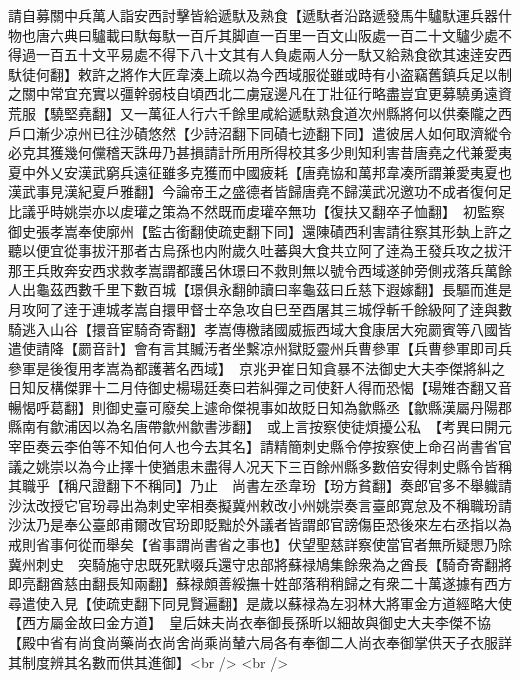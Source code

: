 請自募關中兵萬人詣安西討擊皆給遞馱及熟食【遞馱者沿路遞發馬牛驢馱運兵器什物也唐六典曰驢載曰馱每馱一百斤其脚直一百里一百文山阪處一百二十文驢少處不得過一百五十文平易處不得下八十文其有人負處兩人分一馱又給熟食欲其速逹安西馱徒何翻】敕許之將作大匠韋湊上疏以為今西域服從雖或時有小盗竊舊鎮兵足以制之關中常宜充實以彊幹弱枝自頃西北二虜寇邊凡在丁壯征行略盡豈宜更募驍勇遠資荒服【驍堅堯翻】又一萬征人行六千餘里咸給遞馱熟食道次州縣將何以供秦隴之西戶口漸少凉州已往沙磧悠然【少詩沼翻下同磧七迹翻下同】遣彼居人如何取濟縱令必克其獲幾何儻稽天誅毋乃甚損請計所用所得校其多少則知利害昔唐堯之代兼愛夷夏中外乂安漢武窮兵遠征雖多克獲而中國疲耗【唐堯協和萬邦韋凑所謂兼愛夷夏也漢武事見漢紀夏戶雅翻】今論帝王之盛德者皆歸唐堯不歸漢武况邀功不成者復何足比議乎時姚崇亦以䖍瓘之策為不然既而䖍瓘卒無功【復扶又翻卒子恤翻】　初監察御史張孝嵩奉使廓州【監古銜翻使疏吏翻下同】還陳磧西利害請往察其形埶上許之聽以便宜從事拔汗那者古烏孫也内附歲久吐蕃與大食共立阿了逹為王發兵攻之拔汗那王兵敗奔安西求救孝嵩謂都護呂休璟曰不救則無以號令西域遂帥旁側戎落兵萬餘人出龜茲西數千里下數百城【璟俱永翻帥讀曰率龜茲曰丘慈下遐嫁翻】長驅而進是月攻阿了逹于連城孝嵩自擐甲督士卒急攻自巳至酉屠其三城俘斬千餘級阿了逹與數騎逃入山谷【擐音宦騎奇寄翻】孝嵩傳檄諸國威振西域大食康居大宛罽賓等八國皆遣使請降【罽音計】會有言其贓汚者坐繫凉州獄貶靈州兵曹參軍【兵曹參軍即司兵參軍是後復用孝嵩為都護著名西域】　京兆尹崔日知貪暴不法御史大夫李傑將糾之日知反構傑罪十二月侍御史楊瑒廷奏曰若糾彈之司使姧人得而恐愒【瑒雉杏翻又音暢愒呼葛翻】則御史臺可廢矣上遽命傑視事如故貶日知為歙縣丞【歙縣漢屬丹陽郡縣南有歙浦因以為名唐帶歙州歙書涉翻】　或上言按察使徒煩擾公私　【考異曰開元宰臣奏云李伯等不知伯何人也今去其名】請精簡刺史縣令停按察使上命召尚書省官議之姚崇以為今止擇十使猶患未盡得人况天下三百餘州縣多數倍安得刺史縣令皆稱其職乎【稱尺證翻下不稱同】乃止　尚書左丞韋玢【玢方貧翻】奏郎官多不舉軄請沙汰改授它官玢尋出為刺史宰相奏擬冀州敕改小州姚崇奏言臺郎寛怠及不稱職玢請沙汰乃是奉公臺郎甫爾改官玢即貶黜於外議者皆謂郎官謗傷臣恐後來左右丞指以為戒則省事何從而舉矣【省事謂尚書省之事也】伏望聖慈詳察使當官者無所疑愳乃除冀州刺史　突騎施守忠既死默啜兵還守忠部將蘇禄鳩集餘衆為之酋長【騎奇寄翻將即亮翻酋慈由翻長知兩翻】蘇禄頗善綏撫十姓部落稍稍歸之有衆二十萬遂據有西方尋遣使入見【使疏吏翻下同見賢遍翻】是歲以蘇禄為左羽林大將軍金方道經略大使【西方屬金故曰金方道】　皇后妹夫尚衣奉御長孫昕以細故與御史大夫李傑不協【殿中省有尚食尚藥尚衣尚舍尚乘尚輦六局各有奉御二人尚衣奉御掌供天子衣服詳其制度辨其名數而供其進御】<br />
<br />

